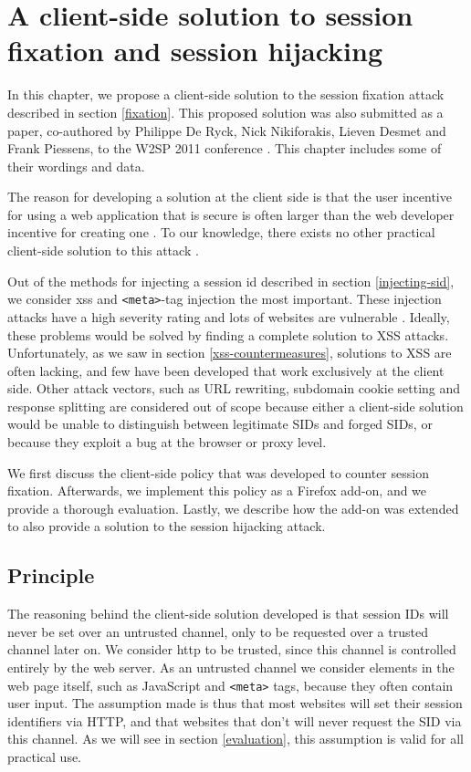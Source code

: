 \chapter{A client-side solution to session fixation and session hijacking}\label{fixation-solution}
In this chapter, we propose a client-side solution to the \gls{session fixation} attack described in section \ref{fixation}. This proposed solution was also submitted as a paper, co-authored by Philippe De Ryck, Nick Nikiforakis, Lieven Desmet and Frank Piessens, to the W2SP 2011 conference \cite{Bonne2011}. This chapter includes some of their wordings and data.

The reason for developing a solution at the client side is that the user incentive for using a web application that is secure is often larger than the web developer incentive for creating one \cite{Johns2011}. To our knowledge, there exists no other practical client-side solution to this attack \cite{Bonne2011}.

Out of the methods for injecting a \gls{session id} described in section \ref{injecting-sid}, we consider \gls{xss} and \texttt{<meta>}-tag injection the most important. These injection attacks have a high severity rating \cite{Williams2010} and lots of websites are vulnerable \cite{Brown2010}. Ideally, these problems would be solved by finding a complete solution to XSS attacks. Unfortunately, as we saw in section \ref{xss-countermeasures}, solutions to XSS are often lacking, and few have been developed that work exclusively at the client side. Other attack vectors, such as URL rewriting, subdomain cookie setting and response splitting are considered out of scope because either a client-side solution would be unable to distinguish between legitimate SIDs and forged SIDs, or because they exploit a bug at the browser or proxy level.

We first discuss the client-side policy that was developed to counter session fixation. Afterwards, we implement this policy as a Firefox add-on, and we provide a thorough evaluation. Lastly, we describe how the add-on was extended to also provide a solution to the session hijacking attack.

\section{Principle}

The reasoning behind the client-side solution developed is that session IDs will never be set over an untrusted channel, only to be requested over a trusted channel later on. We consider \gls{http} to be trusted, since this channel is controlled entirely by the web server. As an untrusted channel we consider elements in the web page itself, such as JavaScript and \texttt{<meta>} tags, because they often contain user input. The assumption made is thus that most websites will set their session identifiers via HTTP, and that websites that don't will never request the SID via this channel. As we will see in section \ref{evaluation}, this assumption is valid for all practical use.

